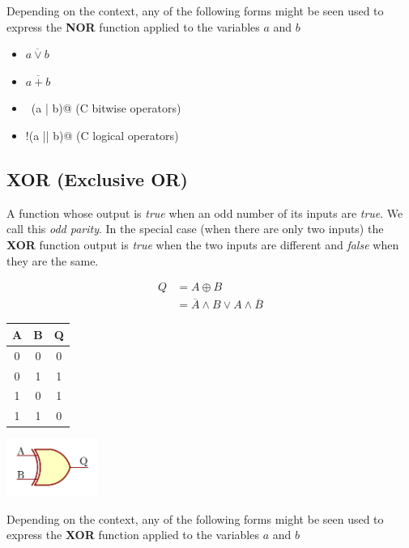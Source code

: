\documentclass[10pt]{article}
\begin{document}
Depending on the context, any of the following forms might be seen used to 
express the {\bfseries NOR} function applied to the variables $a$ and $b$

\begin{itemize}
\item $\overline{a\lor b}$
\item $\overline{a+b}$
\item \verb@~(a | b)@ (C bitwise operators)
\item \verb@!(a || b)@ (C logical operators)
\end{itemize}


\subsection{XOR (Exclusive OR)}

A function whose output is {\em true} when an odd number of its 
inputs are {\em true}.  We call this {\em odd parity}.  In the special case 
(when there are only two inputs) the {\bfseries XOR} function output is {\em true}
when the two inputs are different and {\em false} when they are the same.

\begin{align}
Q &= A \oplus B \\
  &= \overline{A} \land B \lor A \land \overline{B}
\end{align}

\begin{center}
\begin{tabular}{|cc|c|}
\hline
A & B & Q \\
\hline
0 & 0 & 0 \\
0 & 1 & 1 \\
1 & 0 & 1 \\
1 & 1 & 0 \\
\hline
\end{tabular}

\includegraphics[width=3cm]{xor.png}
\end{center}

Depending on the context, any of the following forms might be seen used to 
express the {\bfseries XOR} function applied to the variables $a$ and $b$
\end{document}
